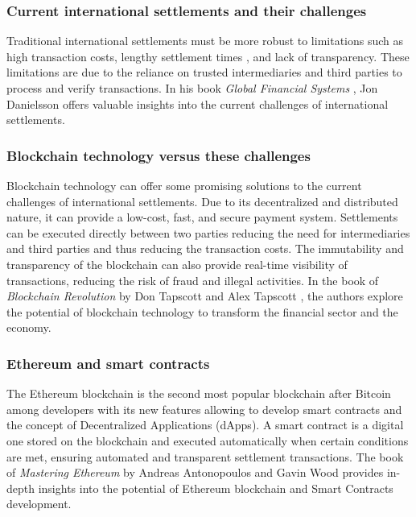 \subsubsection{Current international settlements and their challenges}
Traditional international settlements must be more robust to limitations such as high transaction costs, lengthy settlement times
, and lack of transparency. These limitations are due to the reliance on trusted intermediaries and third parties to process
and verify transactions. In his book \textit{Global Financial Systems} \cite{Danielsson2013-cw}, Jon Danielsson offers
valuable insights into the current challenges of international settlements.

\subsubsection{Blockchain technology versus these challenges}

Blockchain technology can offer some promising solutions to the current challenges of international settlements. Due to its decentralized and distributed nature, it can provide
a low-cost, fast, and secure payment system. Settlements can be executed directly
between two parties reducing the need for intermediaries and third parties and thus reducing the transaction costs. The immutability and
transparency of the blockchain can also provide real-time visibility of transactions, reducing the risk of fraud and illegal activities.
In the book of \textit{Blockchain Revolution} by Don Tapscott and Alex Tapscott \cite{Tapscott2018-ed}, the authors explore the potential of blockchain
technology to transform the financial sector and the economy.

\subsubsection{Ethereum and smart contracts}
The Ethereum blockchain is the second most popular blockchain after Bitcoin among developers with its new features allowing to develop smart contracts and the concept of
Decentralized Applications (dApps). A smart contract is a digital one stored on the blockchain and executed automatically when certain conditions are met, ensuring automated
and transparent settlement transactions. The book of \textit{Mastering Ethereum} by Andreas Antonopoulos and Gavin Wood \cite{Antonopoulos2018-wp} provides
in-depth insights into the potential of Ethereum blockchain and Smart Contracts development.


